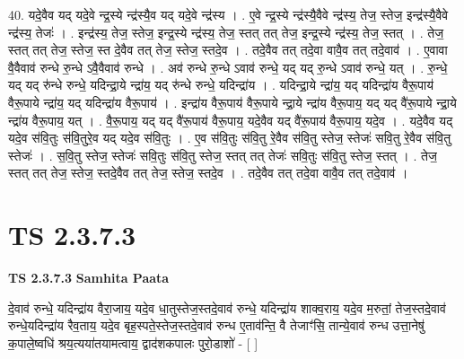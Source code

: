 \documentclass[17pt]{extarticle}
\begin{document}
40. यदे॒वैव यद् यदे॒वे न्द्र॒स्ये न्द्र॑स्यै॒व यद् यदे॒वे न्द्र॑स्य । . ए॒वे न्द्र॒स्ये न्द्र॑स्यै॒वैवे न्द्र॑स्य॒ तेज॒ स्तेज॒ इन्द्र॑स्यै॒वैवे न्द्र॑स्य॒ तेजः॑ । . इन्द्र॑स्य॒ तेज॒ स्तेज॒ इन्द्र॒स्ये न्द्र॑स्य॒ तेज॒ स्तत् तत् तेज॒ इन्द्र॒स्ये न्द्र॑स्य॒ तेज॒ स्तत् । . तेज॒ स्तत् तत् तेज॒ स्तेज॒ स्त दे॒वैव तत् तेज॒ स्तेज॒ स्तदे॒व । . तदे॒वैव तत् तदे॒वा वावै॒व तत् तदे॒वाव॑ । . ए॒वावा वै॒वैवाव॑ रुन्धे रु॒न्धे ऽवै॒वैवाव॑ रुन्धे । . अव॑ रुन्धे रु॒न्धे ऽवाव॑ रुन्धे॒ यद् यद् रु॒न्धे ऽवाव॑ रुन्धे॒ यत् । . रु॒न्धे॒ यद् यद् रु॑न्धे रुन्धे॒ यदिन्द्रा॒ये न्द्रा॑य॒ यद् रु॑न्धे रुन्धे॒ यदिन्द्रा॑य । . यदिन्द्रा॒ये न्द्रा॑य॒ यद् यदिन्द्रा॑य वैरू॒पाय॑ वैरू॒पाये न्द्रा॑य॒ यद् यदिन्द्रा॑य वैरू॒पाय॑ । . इन्द्रा॑य वैरू॒पाय॑ वैरू॒पाये न्द्रा॒ये न्द्रा॑य वैरू॒पाय॒ यद् यद् वै॑रू॒पाये न्द्रा॒ये न्द्रा॑य वैरू॒पाय॒ यत् । . वै॒रू॒पाय॒ यद् यद् वै॑रू॒पाय॑ वैरू॒पाय॒ यदे॒वैव यद् वै॑रू॒पाय॑ वैरू॒पाय॒ यदे॒व । . यदे॒वैव यद् यदे॒व स॑वि॒तुः स॑वि॒तुरे॒व यद् यदे॒व स॑वि॒तुः । . ए॒व स॑वि॒तुः स॑वि॒तु रे॒वैव स॑वि॒तु स्तेज॒ स्तेजः॑ सवि॒तु रे॒वैव स॑वि॒तु स्तेजः॑ । . स॒वि॒तु स्तेज॒ स्तेजः॑ सवि॒तुः स॑वि॒तु स्तेज॒ स्तत् तत् तेजः॑ सवि॒तुः स॑वि॒तु स्तेज॒ स्तत् । . तेज॒ स्तत् तत् तेज॒ स्तेज॒ स्तदे॒वैव तत् तेज॒ स्तेज॒ स्तदे॒व । . तदे॒वैव तत् तदे॒वा वावै॒व तत् तदे॒वाव॑ । \newline
\pagebreak
{}
\section*{ TS 2.3.7.3 }

\textbf{TS 2.3.7.3 } \newline
\textbf{Samhita Paata} \newline

दे॒वाव॑ रुन्धे॒ यदिन्द्रा॑य वैरा॒जाय॒ यदे॒व धा॒तुस्तेज॒स्तदे॒वाव॑ रुन्धे॒ यदिन्द्रा॑य शाक्व॒राय॒ यदे॒व म॒रुतां॒ तेज॒स्तदे॒वाव॑ रुन्धे॒यदिन्द्रा॑य रैव॒ताय॒ यदे॒व बृह॒स्पते॒स्तेज॒स्तदे॒वाव॑ रुन्ध ए॒ताव॑न्ति॒ वै तेजाꣳ॑सि॒ तान्ये॒वाव॑ रुन्ध उत्ता॒नेषु॑ क॒पाले॒ष्वधि॑ श्रय॒त्यया॑तयामत्वाय॒ द्वाद॑शकपालः पुरो॒डाशो॑ - [  ] \newline
\end{document}
